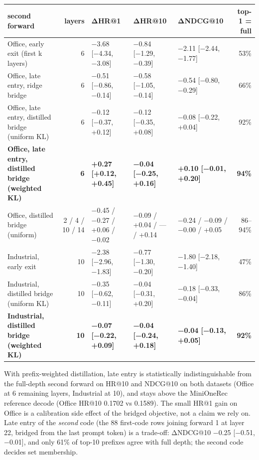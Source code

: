 \documentclass[11pt]{article}
\begin{document}
{\footnotesize
\setlength{\tabcolsep}{4pt}
\begin{xltabular}{\linewidth}{>{\raggedright\arraybackslash{}\hsize}Xr>{\raggedright\arraybackslash{}\hsize}X>{\raggedright\arraybackslash{}\hsize}X>{\raggedright\arraybackslash{}\hsize}Xr}
\toprule
second forward & layers & ΔHR@1 & ΔHR@10 & ΔNDCG@10 & top-1 = full \\
\midrule
\endhead
Office, early exit (first k layers) & 6 & −3.68 [−4.34, −3.08] & −0.84 [−1.29, −0.39] & −2.11 [−2.44, −1.77] & 53\% \\
Office, late entry, ridge bridge & 6 & −0.51 [−0.86, −0.14] & −0.58 [−1.05, −0.14] & −0.54 [−0.80, −0.29] & 66\% \\
Office, late entry, distilled bridge (uniform KL) & 6 & −0.12 [−0.37, +0.12] & −0.12 [−0.35, +0.08] & −0.08 [−0.22, +0.04] & 92\% \\
\textbf{Office, late entry, distilled bridge (weighted KL)} & \textbf{6} & \textbf{+0.27 [+0.12, +0.45]} & \textbf{−0.04 [−0.25, +0.16]} & \textbf{+0.10 [−0.01, +0.20]} & \textbf{94\%} \\
Office, distilled bridge (uniform) & 2 / 4 / 10 / 14 & −0.45 / −0.27 / +0.06 / −0.02 & −0.09 / +0.04 / — / +0.14 & −0.24 / −0.09 / −0.00 / +0.05 & 86–94\% \\
Industrial, early exit & 10 & −2.38 [−2.96, −1.83] & −0.77 [−1.30, −0.20] & −1.80 [−2.18, −1.40] & 47\% \\
Industrial, distilled bridge (uniform KL) & 10 & −0.35 [−0.62, −0.11] & −0.04 [−0.31, +0.20] & −0.18 [−0.33, −0.04] & 86\% \\
\textbf{Industrial, distilled bridge (weighted KL)} & \textbf{10} & \textbf{−0.07 [−0.22, +0.09]} & \textbf{−0.04 [−0.24, +0.18]} & \textbf{−0.04 [−0.13, +0.05]} & \textbf{92\%} \\
\bottomrule
\end{xltabular}
}

With prefix-weighted distillation, late entry is statistically indistinguishable from the full-depth second forward on HR@10 and NDCG@10 on both datasets (Office at 6 remaining layers, Industrial at 10), and stays above the MiniOneRec reference decode (Office HR@10 0.1702 vs 0.1589). The small HR@1 gain on Office is a calibration side effect of the bridged objective, not a claim we rely on. Late entry of the \emph{second} code (the 88 first-code rows joining forward 1 at layer 22, bridged from the last prompt token) is a trade-off: ΔNDCG@10 −0.25 [−0.51, −0.01], and only 61\% of top-10 prefixes agree with full depth; the second code decides set membership.
\end{document}
